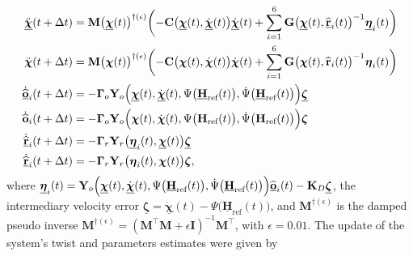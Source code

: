 \begin{align}
    \begin{split}
        \ddot{\underline{\boldsymbol{\chi}}}(t+\Delta t) &= \mathbf{M}\bigl(\underline{\boldsymbol{\chi}}(t)\bigr)^{\dagger(\epsilon)}\biggl(-\mathbf{C}\bigl(\underline{\boldsymbol{\chi}}(t), \underline{\dot{\boldsymbol{\chi}}}(t)\bigr)\underline{\dot{\boldsymbol{\chi}}}(t)  + \sum_{i=1}^6 \mathbf{G}\bigl(\underline{\boldsymbol{\chi}}(t), \underline{\widehat{\mathbf{r}}}_i(t)\bigr)^{-1}\underline{\boldsymbol{\eta}}_i(t)\biggr)\\
        \ddot{{\boldsymbol{\chi}}}(t+\Delta t) &= \mathbf{M}\bigl({\boldsymbol{\chi}}(t)\bigr)^{\dagger(\epsilon)}\biggl(-\mathbf{C}\bigl({\boldsymbol{\chi}}(t), {\dot{\boldsymbol{\chi}}}(t)\bigr)\dot{\boldsymbol{\chi}}(t)  + \sum_{i=1}^6 \mathbf{G}\bigl({\boldsymbol{\chi}}(t), {\widehat{\mathbf{r}}}_i(t)\bigr)^{-1}{\boldsymbol{\eta}}_i(t)\biggr)\\
        \underline{\dot{\widehat{\mathbf{o}}}}_i(t + \Delta t) &= -\boldsymbol{\Gamma}_o\mathbf{Y}_o\Bigl(\underline{\boldsymbol{\chi}}(t), \underline{\dot{\boldsymbol{\chi}}}(t), \Psi\bigl(\underline{\mathbf{H}}_\text{ref}(t)\bigr), \dot{\Psi}\bigl(\underline{\mathbf{H}}_\text{ref}(t)\bigr)\Bigr)\underline{\boldsymbol{\zeta}}\\
        {\dot{\widehat{\mathbf{o}}}}_i(t + \Delta t) &= -\boldsymbol{\Gamma}_o\mathbf{Y}_o\Bigl({\boldsymbol{\chi}}(t), {\dot{\boldsymbol{\chi}}}(t), \Psi\bigl({\mathbf{H}_\text{ref}}(t)\bigr), \dot{\Psi}\bigl({\mathbf{H}_\text{ref}}(t)\bigr)\Bigr){\boldsymbol{\zeta}}\\
        \underline{\dot{\widehat{\mathbf{r}}}}_i(t + \Delta t) &= -\boldsymbol{\Gamma}_r\mathbf{Y}_r\bigl(\underline{\boldsymbol{\eta}}_i(t), \underline{\boldsymbol{\chi}}(t)\bigr)\underline{\boldsymbol{\zeta}}\\
        \underline{\dot{\widehat{\mathbf{r}}}}_i(t + \Delta t) &= -\boldsymbol{\Gamma}_r\mathbf{Y}_r\bigl({\boldsymbol{\eta}}_i(t), {\boldsymbol{\chi}}(t)\bigr){\boldsymbol{\zeta}},
    \end{split}
\end{align}
where $\underline{\boldsymbol{\eta}}_i(t) = \mathbf{Y}_o\Bigl(\underline{\boldsymbol{\chi}}(t), \underline{\dot{\boldsymbol{\chi}}}(t), \Psi\bigl(\underline{\mathbf{H}}_\text{ref}(t)\bigr), \dot{\Psi}\bigl(\underline{\mathbf{H}}_\text{ref}(t)\bigr)\Bigr)\underline{\widehat{\mathbf{o}}}_i(t) - \mathbf{K}_D\underline{\boldsymbol{\zeta}}$, the intermediary velocity error $\underline{\boldsymbol{\zeta}}=\underline{\dot{\boldsymbol{\chi}}}(t) - \Psi\bigl(\underline{\mathbf{H}}_\text{ref}(t)\bigr)$, and $\mathbf{M}^{\dagger(\epsilon)}$ is the damped pseudo inverse $\mathbf{M}^{\dagger(\epsilon)} = (\mathbf{M}^\top\mathbf{M} + \epsilon\mathbf{I})^{-1}\mathbf{M}^\top$, with $\epsilon=0.01$. The update of the system's twist and parameters estimates were given by
